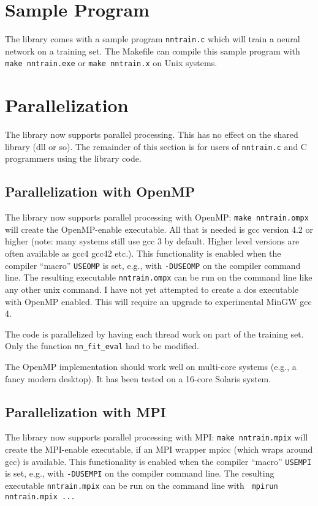 \documentclass{article}    %
\begin{document}
\section{Sample Program}
The library comes with a sample program \verb|nntrain.c| which will
train a neural network on a training set. The Makefile can compile
this sample program with \verb|make nntrain.exe| or \verb|make nntrain.x|
on Unix systems.

\section{Parallelization}
The library now supports parallel processing. This has no effect on
the shared library (dll or so). The remainder of this section is for
users of \verb|nntrain.c| and C programmers using the library code.

\subsection{Parallelization with OpenMP}
The library now supports parallel processing with OpenMP:
\verb|make nntrain.ompx| will create the OpenMP-enable executable. All
that is needed is gcc version 4.2 or higher (note: many systems still
use gcc 3 by default. Higher level versions are often available as
gcc4 gcc42 etc.). This functionality is enabled when the compiler
``macro'' \verb|USEOMP| is set, e.g., with \verb|-DUSEOMP| on the
compiler command line. The resulting executable \verb|nntrain.ompx|
can be run on the command line like any other unix command. I have not
yet attempted to create a dos executable with OpenMP enabled. This
will require an upgrade to experimental MinGW gcc 4.

The code is parallelized by having each thread work on part of the
training set. Only the function \verb|nn_fit_eval| had to be modified.

The OpenMP implementation should work well on multi-core systems
(e.g., a fancy modern desktop). It has been tested on a 16-core
Solaris system.

\subsection{Parallelization with MPI}
The library now supports parallel processing with MPI:
\verb|make nntrain.mpix| will create the MPI-enable executable, if an
MPI wrapper mpicc (which wraps around gcc) is available. This
functionality is enabled when the compiler ``macro'' \verb|USEMPI| is
set, e.g., with \verb|-DUSEMPI| on the compiler command line.  The
resulting executable \verb|nntrain.mpix| can be run on the command
line with \verb| mpirun nntrain.mpix ...|
\end{document}
